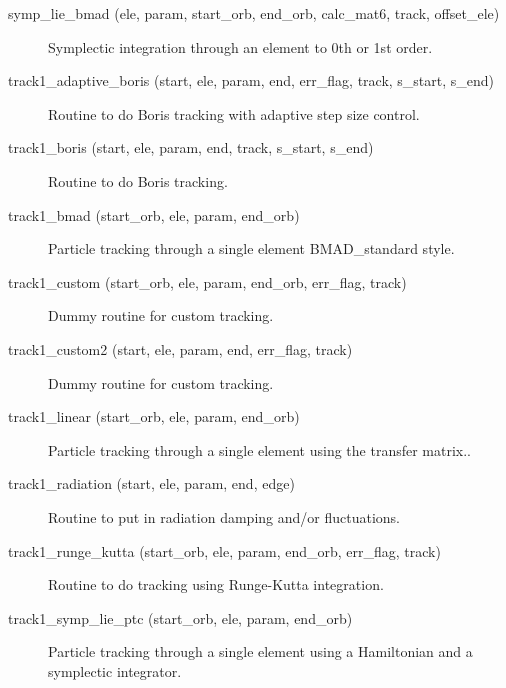 \begin{description}

\label{r:symp.lie.bmad}
\item[symp_lie_bmad (ele, param, start_orb, end_orb, calc_mat6, track, offset_ele)] \Newline
Symplectic integration through an element to 0th or 1st order.

\label{r:track1.adaptive.boris}
\item[track1_adaptive_boris (start, ele, param, end, err_flag, track, s_start, s_end)] \Newline
Routine to do Boris tracking with adaptive step size control. 

\label{r:track1.boris}
\item[track1_boris (start, ele, param, end, track, s_start, s_end)] \Newline
Routine to do Boris tracking.  

\label{r:track1.bmad}
\item[track1_bmad (start_orb, ele, param, end_orb)] \Newline
Particle tracking through a single element BMAD_standard style. 

\label{r:track1.custom}
\item[track1_custom (start_orb, ele, param, end_orb, err_flag, track)] \Newline
Dummy routine for custom tracking.

\label{r:track1.custom2}
\item[track1_custom2 (start, ele, param, end, err_flag, track)] \Newline
Dummy routine for custom tracking.

\label{r:track1.linear}
\item[track1_linear (start_orb, ele, param, end_orb)] \Newline
Particle tracking through a single element using the transfer matrix.. 

\label{r:track1.radiation}
\item[track1_radiation (start, ele, param, end, edge)] \Newline
Routine to put in radiation damping and/or fluctuations. 

\label{r:track1.runge.kutta}
\item[track1_runge_kutta (start_orb, ele, param, end_orb, err_flag, track)] \Newline
Routine to do tracking using Runge-Kutta integration. 

\label{r:track1.symp.lie.ptc}
\item[track1_symp_lie_ptc (start_orb, ele, param, end_orb)] \Newline
Particle tracking through a single element using a Hamiltonian and a 
symplectic integrator. 


\end{description}
